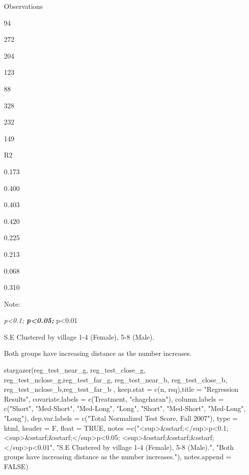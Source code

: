 \documentclass[
]{article}
\newenvironment{Shaded}{\begin{snugshade}}{\end{snugshade}}
\newcommand{\AttributeTok}[1]{\textcolor[rgb]{0.77,0.63,0.00}{#1}}
\newcommand{\ConstantTok}[1]{\textcolor[rgb]{0.00,0.00,0.00}{#1}}
\newcommand{\FunctionTok}[1]{\textcolor[rgb]{0.00,0.00,0.00}{#1}}
\newcommand{\NormalTok}[1]{#1}
\newcommand{\StringTok}[1]{\textcolor[rgb]{0.31,0.60,0.02}{#1}}
\begin{document}
Observations

94

272

204

123

88

328

232

149

R2

0.173

0.400

0.403

0.420

0.225

0.213

0.068

0.310

Note:

\emph{p\textless0.1; \textbf{p\textless0.05; }}p\textless0.01

S.E Clustered by village 1-4 (Female), 5-8 (Male).

Both groups have increasing distance as the number increases.

\begin{Shaded}
\begin{Highlighting}[]
\FunctionTok{stargazer}\NormalTok{(reg\_test\_near\_g, reg\_test\_close\_g, reg\_test\_nclose\_g,reg\_test\_far\_g, reg\_test\_near\_b, reg\_test\_close\_b, reg\_test\_nclose\_b,reg\_test\_far\_b , }\AttributeTok{keep.stat =} \FunctionTok{c}\NormalTok{(}\StringTok{\textquotesingle{}n\textquotesingle{}}\NormalTok{, }\StringTok{\textquotesingle{}rsq\textquotesingle{}}\NormalTok{),}\AttributeTok{title =} \StringTok{"Regression Results"}\NormalTok{,}
          \AttributeTok{covariate.labels =} \FunctionTok{c}\NormalTok{(}\StringTok{\textquotesingle{}Treatment\textquotesingle{}}\NormalTok{, }\StringTok{"chagcharan"}\NormalTok{), }\AttributeTok{column.labels =} \FunctionTok{c}\NormalTok{(}\StringTok{"Short"}\NormalTok{, }\StringTok{"Med{-}Short"}\NormalTok{, }\StringTok{"Med{-}Long"}\NormalTok{, }\StringTok{"Long"}\NormalTok{, }\StringTok{"Short"}\NormalTok{, }\StringTok{"Med{-}Short"}\NormalTok{, }\StringTok{"Med{-}Long"}\NormalTok{, }\StringTok{"Long"}\NormalTok{),}
          \AttributeTok{dep.var.labels =} \FunctionTok{c}\NormalTok{(}\StringTok{"Total Normalized Test Score, Fall 2007"}\NormalTok{), }
          \AttributeTok{type =} \StringTok{\textquotesingle{}html\textquotesingle{}}\NormalTok{, }\AttributeTok{header =}\NormalTok{ F, }\AttributeTok{float =} \ConstantTok{TRUE}\NormalTok{,  }\AttributeTok{notes =}\FunctionTok{c}\NormalTok{(}\StringTok{"\textless{}sup\textgreater{}\&sstarf;\textless{}/sup\textgreater{}p\textless{}0.1; \textless{}sup\textgreater{}\&sstarf;\&sstarf;\textless{}/sup\textgreater{}p\textless{}0.05; \textless{}sup\textgreater{}\&sstarf;\&sstarf;\&sstarf;\textless{}/sup\textgreater{}p\textless{}0.01"}\NormalTok{, }\StringTok{"S.E Clustered by village 1{-}4 (Female), 5{-}8 (Male)."}\NormalTok{, }
          \StringTok{"Both groups have increasing distance as the number increases."}\NormalTok{), }\AttributeTok{notes.append =} \ConstantTok{FALSE}\NormalTok{)}
\end{Highlighting}
\end{Shaded}
\end{document}
